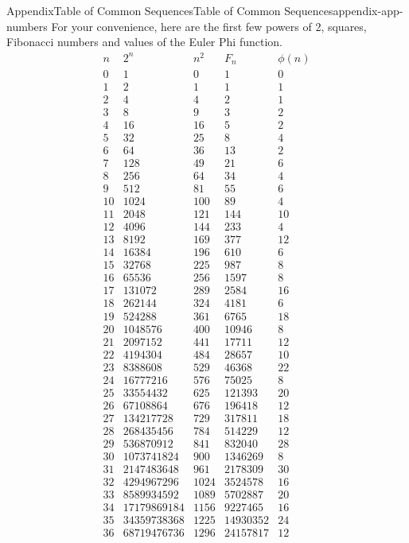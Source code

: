 \documentclass[oneside,10pt,]{book}
\numberwithin{equation}{section}
\begin{document}
\begin{appendixptx}{Appendix}{Table of Common Sequences}{}{Table of Common Sequences}{}{}{appendix-app-numbers}
\renewcommand*{\appendixname}{Appendix}
For your convenience, here are the first few powers of 2, squares, Fibonacci numbers and values of the Euler Phi function.%
\begin{equation*}
\begin{array}{ccccc}
n & 2^n & n^2 &F_n & \phi(n) \\
0 &1 &0 &1 &0 \\
1 &2 &1 &1 &1 \\
2 &4 &4 &2 &1 \\
3 &8 &9 &3 &2 \\
4 &16 &16 &5 &2 \\
5 &32 &25 &8 &4 \\
6 &64 &36 &13 &2 \\
7 &128 &49 &21 &6 \\
8 &256 &64 &34 &4 \\
9 &512 &81 &55 &6 \\
10 &1024 &100 &89 &4 \\
11 &2048 &121 &144 &10 \\
12 &4096 &144 &233 &4 \\
13 &8192 &169 &377 &12 \\
14 &16384 &196 &610 &6 \\
15 &32768 &225 &987 &8 \\
16 &65536 &256 &1597 &8 \\
17 &131072 &289 &2584 &16 \\
18 &262144 &324 &4181 &6 \\
19 &524288 &361 &6765 &18 \\
20 &1048576 &400 &10946 &8 \\
21 &2097152 &441 &17711 &12 \\
22 &4194304 &484 &28657 &10 \\
23 &8388608 &529 &46368 &22 \\
24 &16777216 &576 &75025 &8 \\
25 &33554432 &625 &121393 &20 \\
26 &67108864 &676 &196418 &12 \\
27 &134217728 &729 &317811 &18 \\
28 &268435456 &784 &514229 &12 \\
29 &536870912 &841 &832040 &28 \\
30 &1073741824 &900 &1346269 &8 \\
31 &2147483648 &961 &2178309 &30 \\
32 &4294967296 &1024 &3524578 &16 \\
33 &8589934592 &1089 &5702887 &20 \\
34 &17179869184 &1156 &9227465 &16 \\
35 &34359738368 &1225 &14930352 &24 \\
36 &68719476736 &1296 &24157817 &12 \\
\end{array}
\end{equation*}
%
\end{appendixptx}
\end{document}
